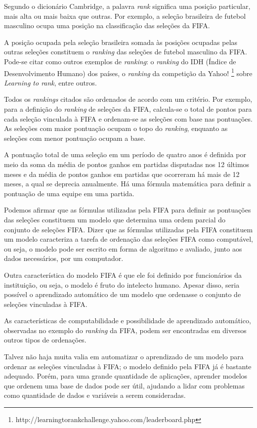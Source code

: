 Segundo o dicionário Cambridge, a palavra \emph{rank} significa uma posição particular, mais alta ou mais baixa que outras. Por exemplo, a seleção brasileira de futebol masculino ocupa uma posição na classificação das seleções da FIFA.

A posição ocupada pela seleção brasileira somada às posições ocupadas pelas outras seleções constituem o \emph{ranking} das seleções de futebol masculino da FIFA. Pode-se citar como outros exemplos de \emph{ranking}: o \emph{ranking} do IDH (Índice de Desenvolvimento Humano) dos países, o \emph{ranking} da competição da Yahoo! \footnote{http://learningtorankchallenge.yahoo.com/leaderboard.php} sobre \emph{Learning to rank}, entre outros.

Todos os \emph{rankings} citados são ordenados de acordo com um critério. Por exemplo, para a definição do \emph{ranking} de seleções da FIFA, calcula-se o total de pontos para cada seleção vinculada à FIFA e ordenam-se as seleções com base nas pontuações. As seleções com maior pontuação ocupam o topo do \emph{ranking}, enquanto as seleções com menor pontuação ocupam a base.

A pontuação total de uma seleção em um período de quatro anos é definida por meio da soma da média de pontos ganhos em partidas disputadas nos 12 últimos meses e da média de pontos ganhos em partidas que ocorreram há mais de 12 meses, a qual se deprecia anualmente. Há uma fórmula matemática para definir a pontuação de uma equipe em uma partida.

Podemos afirmar que as fórmulas utilizadas pela FIFA para definir as pontuações das seleções constituem um modelo que determina uma ordem parcial do conjunto de seleções FIFA. Dizer que as fórmulas utilizadas pela FIFA constituem um modelo caracteriza a tarefa de ordenação das seleções FIFA como computável, ou seja, o modelo pode ser escrito em forma de algoritmo e avaliado, junto aos dados necessários, por um computador.

Outra característica do modelo FIFA é que ele foi definido por funcionários da instituição, ou seja, o modelo é fruto do intelecto humano. Apesar disso, seria possível o aprendizado automático de um modelo que ordenasse o conjunto de seleções vinculadas à FIFA.

As características de computabilidade e possibilidade de aprendizado automático, observadas no exemplo do \emph{ranking} da FIFA, podem ser encontradas em diversos outros tipos de ordenações.

Talvez não haja muita valia em automatizar o aprendizado de um modelo para ordenar as seleções vinculadas à FIFA; o modelo definido pela FIFA já é bastante adequado. Porém, para uma grande quantidade de aplicações, aprender modelos que ordenem uma base de dados pode ser útil, ajudando a lidar com problemas como quantidade de dados e variáveis a serem consideradas.


